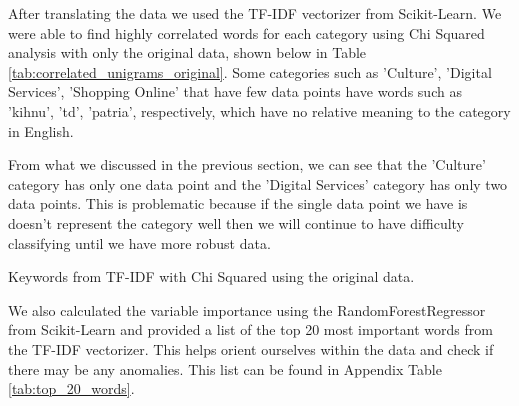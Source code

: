 After translating the data we used the TF-IDF vectorizer from Scikit-Learn. We were able to find highly correlated words for each category using Chi Squared analysis with only the original data, shown below in Table \ref{tab:correlated_unigrams_original}. Some categories such as 'Culture', 'Digital Services', 'Shopping Online' that have few data points have words such as 'kihnu', 'td', 'patria', respectively, which have no relative meaning to the category in English. 

From what we discussed in the previous section, we can see that the 'Culture' category has only one data point and the 'Digital Services' category has only two data points. This is problematic because if the single data point we have is doesn't represent the category well then we will continue to have difficulty classifying until we have more robust data.


\begin{table}[!ht]
\centering
\caption{Keywords from TF-IDF with Chi Squared using the original data.}

\label{tab:correlated_unigrams_original}
\end{table}

We also calculated the variable importance using the RandomForestRegressor from Scikit-Learn and provided a list of the top 20 most important words from the TF-IDF vectorizer. This helps orient ourselves within the data and check if there may be any anomalies. This list can be found in Appendix Table \ref{tab:top_20_words}.



